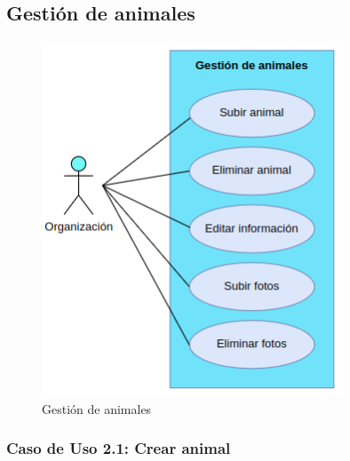 \subsection{Gestión de animales}\label{subsec:gestion-de-animales}

\begin{figure}[H]
    \centering
    \includegraphics[width=0.8\textwidth]{imgs/gestion-animales}
    \caption{Gestión de animales}
    \label{fig:diagrama-caso-uso-gestion-animales}
\end{figure}

\subsubsection{Caso de Uso 2.1: Crear animal}\label{subsubsec:crear-animal}

